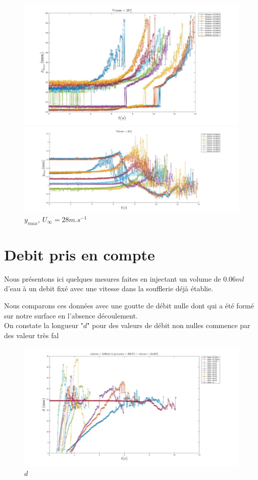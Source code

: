 \begin{figure}[!h]
	\centering
	\begin{minipage}{0.8\linewidth}
	\includegraphics[width = \linewidth]{./image/v=28xm.jpg}
	\caption{$x_{max}$, $U_{\infty}=28m.s^{-1}$}
		\label{fig:v=28xm}
	\end{minipage}
	\begin{minipage}{0.8\linewidth}
	\includegraphics[width = \linewidth]{./image/v=28ym.jpg}
	\caption{$y_{max}$, $U_{\infty}=28m.s^{-1}$}
		\label{fig:v=28ym}
	\end{minipage}
\end{figure}

\section{Debit pris en compte}

Nous présentons ici quelques mesures faites en injectant un volume de $0.06ml$ d'eau  à un debit fixé avec une vitesse dans la soufflerie déjà établie.

Nous comparons ces données avec une goutte de débit nulle dont qui a été formé sur notre surface en l'absence découlement.\\


On constate la longueur "$d$" pour des valeurs de débit non nulles commence par des valeur très fal

\begin{figure}[!h]
	\centering
	\includegraphics[width = \linewidth]{./image/p=365_vol=006d.jpg}
	\caption{$d$}
\label{fig:p=365_vol=006d}
\end{figure}
